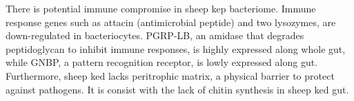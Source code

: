 \documentclass[11pt]{article}
\begin{document}
\newline

There is potential immune compromise in sheep kep bacteriome. 
Immune response genes such as attacin (antimicrobial peptide) and two lysozymes, are down-regulated in bacteriocytes. 
PGRP-LB, an amidase that degrades peptidoglycan to inhibit immune responses, is highly expressed along whole gut, while GNBP, a pattern recognition receptor, is lowly expressed along gut. 
Furthermore, sheep ked lacks peritrophic matrix, a physical barrier to protect against pathogens. 
It is consist with the lack of chitin synthesis in sheep ked gut.
\end{document}
